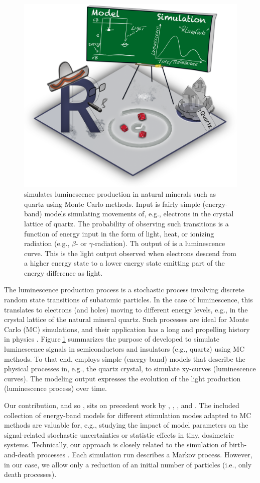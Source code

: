 \begin{figure}[h]
\begin{center}
\includegraphics[width=.6\textwidth]{figures/Fig0-1.png}
\caption{ simulates luminescence production in natural minerals such as quartz using Monte Carlo methods. Input is fairly simple (energy-band) models simulating movements of, e.g., electrons in the crystal lattice of quartz. The probability of observing such transitions is a function of energy input in the form of light, heat, or ionizing radiation (e.g., $\beta$- or $\gamma$-radiation). Th output of  is a luminescence curve. This is the light output observed when electrons descend from a higher energy state to a lower energy state emitting part of the energy difference as light.}
\label{fig:Fig0}
\end{center}
\end{figure}
\newpage{}

The luminescence production process is a stochastic process involving
discrete random state transitions of subatomic particles. In the case of
luminescence, this translates to electrons (and holes) moving to
different energy levels, e.g., in the crystal lattice of the natural
mineral quartz. Such processes are ideal for Monte Carlo (MC)
simulations, and their application has a long and propelling history in
physics \citep[cf.][]{Landau:2015vp}. Figure\(~\)\ref{fig:Fig0}
summarizes the purpose of  developed to simulate
luminescence signals in semiconductors and insulators (e.g., quartz)
using MC methods. To that end,  employs simple
(energy-band) models that describe the physical processes in, e.g., the
quartz crystal, to simulate xy-curves (luminescence curves). The
modeling output expresses the evolution of the light production
(luminescence process) over time.

Our contribution, and so , sits on precedent work by
\citet{Pagonis:2014cs}, \citet{Pagonis:2014gu}, \citet{Pagonis:2019hk},
and \citet{Pagonis:2020bt}. The included collection of energy-band
models for different stimulation modes adapted to MC methods are
valuable for, e.g., studying the impact of model parameters on the
signal-related stochastic uncertainties or statistic effects in tiny,
dosimetric systems. Technically, our approach is closely related to the
simulation of birth-and-death processes \citep[for a review on
birth-and-death process cf.][]{Novozhilov:2006hd}. Each simulation run
describes a Markov process. However, in our case, we allow only a
reduction of an initial number of particles (i.e., only death
processes).

